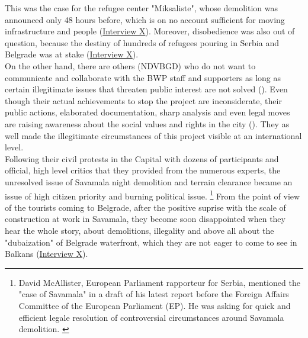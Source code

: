\documentclass[11pt]{report}
\begin{document}
This was the case for the refugee center "Miksaliste", whose demolition was announced only 48 hours before, which is on no account sufficient for moving infrastructure and people
(\href{InterviewX}{Interview X}).
Moreover, disobedience was also out of question, because  the destiny of hundreds of refugees pouring in Serbia and Belgrade was at stake (\href{InterviewX}{Interview X}).
\\

On the other hand, there are others (NDVBGD) who do not want to communicate and collaborate with the BWP staff and supporters as long as certain illegitimate issues that threaten public interest are not solved (\cite{ref media}).
Even though their actual achievements to stop the project are inconsiderate, their public actions, elaborated documentation, sharp analysis and even legal moves are raising awareness about the social values and rights in the city (\cite{ref media and documents NDVBGD}).
They as well made the illegitimate circumstances of this project visible at an international level.
\\

Following their civil protests in the Capital with dozens of participants and official, high level critics that they provided from the numerous experts, the unresolved issue of Savamala night demolition and terrain clearance became an issue of high citizen priority and burning political issue.
\footnote{David McAllister, European Parliament rapporteur for Serbia, mentioned the "case of Savamala" in a draft of his latest report before the Foreign Affairs Committee of the European Parliament (EP). He was asking for quick and efficient legale resolution of controversial circumstances around Savamala demolition. \citealt{stojanovic_fajon:_2017}}
From the point of view of the tourists coming to Belgrade, after the positive suprise with the scale of construction at work in Savamala, they become soon disappointed when they hear the whole story, about demolitions, illegality and above all about the "dubaization" of Belgrade waterfront, which they are not eager to come to see in Balkans (\href{InterviewX}{Interview X}).
\\
\end{document}
